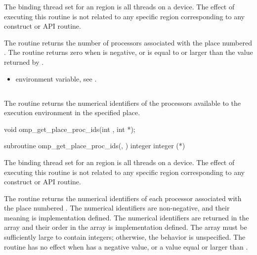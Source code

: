 \binding
The binding thread set for an   region is all threads on a device. The effect of executing this routine is not related to any specific region corresponding to any construct or API routine.

\effect
The  routine returns the number of 
processors associated with the place numbered . The 
routine returns zero when  is negative, or is equal 
to or larger than the value returned by . 

\crossreferences
\begin{itemize}
\item {} environment variable, see 
.
\end{itemize}




\subsection{}
\label{subsec:omp_get_place_proc_ids}

\summary
The  routine returns the numerical identifiers of the processors available to the execution environment in the specified place.

\format
\ccppspecificstart
\begin{boxedcode}
void omp\_get\_place\_proc\_ids(int , int *);
\end{boxedcode}
\ccppspecificend

\fortranspecificstart
\begin{boxedcode}
subroutine omp\_get\_place\_proc\_ids(, )
integer 
integer (*)
\end{boxedcode}
\fortranspecificend

\binding
The binding thread set for an  region is all 
threads on a device. The effect of executing this routine is not related to 
any specific region corresponding to any construct or API routine.

\effect
The  routine returns the numerical 
identifiers of each processor associated with the place numbered 
. The numerical identifiers are non-negative, and 
their meaning is implementation defined.  The numerical identifiers 
are returned in the array  and their order in the array is 
implementation defined. The array must be sufficiently large to contain 
\code{)} integers; 
otherwise, the behavior is unspecified.  The routine has no effect when 
 has a negative value, or a value equal or larger 
than .

